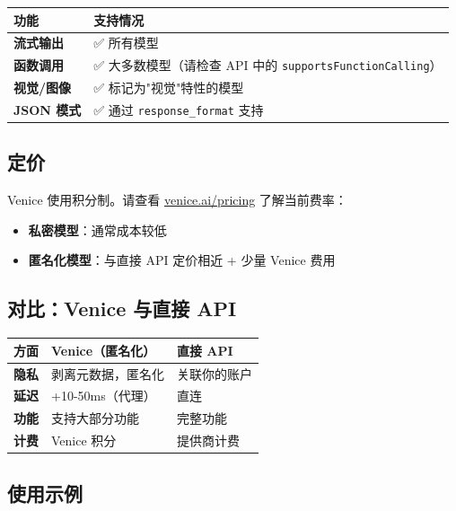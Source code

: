 \begin{table}[h]
\centering
\small
\begin{tabular}{|l|l|}
\hline
功能 & 支持情况 \\
\hline
\textbf{流式输出} & ✅ 所有模型 \\
\hline
\textbf{函数调用} & ✅ 大多数模型（请检查 API 中的 \texttt{supportsFunctionCalling}） \\
\hline
\textbf{视觉/图像} & ✅ 标记为"视觉"特性的模型 \\
\hline
\textbf{JSON 模式} & ✅ 通过 \texttt{response\_format} 支持 \\
\hline
\end{tabular}
\end{table}



\subsection{定价}


Venice 使用积分制。请查看 \href{https://venice.ai/pricing}{venice.ai/pricing} 了解当前费率：

\begin{itemize}
  \item \textbf{私密模型}：通常成本较低
  \item \textbf{匿名化模型}：与直接 API 定价相近 + 少量 Venice 费用
\end{itemize}


\subsection{对比：Venice 与直接 API}



\begin{table}[h]
\centering
\small
\begin{tabular}{|l|l|l|}
\hline
方面 & Venice（匿名化） & 直接 API \\
\hline
\textbf{隐私} & 剥离元数据，匿名化 & 关联你的账户 \\
\hline
\textbf{延迟} & +10-50ms（代理） & 直连 \\
\hline
\textbf{功能} & 支持大部分功能 & 完整功能 \\
\hline
\textbf{计费} & Venice 积分 & 提供商计费 \\
\hline
\end{tabular}
\end{table}



\subsection{使用示例}


